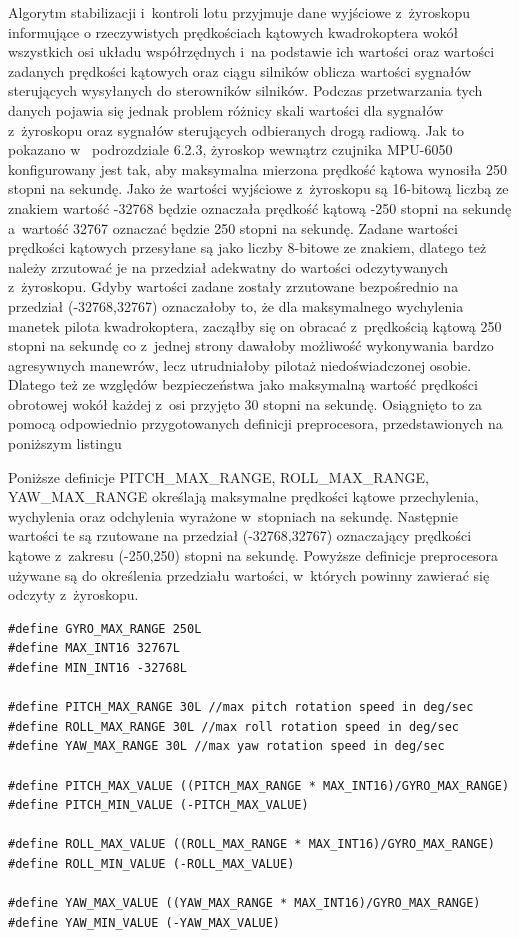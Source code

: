 \documentclass[11pt, twoside]{Thesis} %
\begin{document}
Algorytm stabilizacji i~kontroli lotu przyjmuje dane wyjściowe z~żyroskopu informujące o rzeczywistych prędkościach kątowych kwadrokoptera wokół wszystkich osi układu współrzędnych i~na podstawie ich wartości oraz wartości zadanych prędkości kątowych oraz ciągu silników oblicza wartości sygnałów sterujących wysyłanych do sterowników silników. Podczas przetwarzania tych danych pojawia się jednak problem różnicy skali wartości dla sygnałów z~żyroskopu oraz sygnałów sterujących odbieranych drogą radiową. Jak to pokazano w~ podrozdziale 6.2.3, żyroskop wewnątrz czujnika MPU-6050 konfigurowany jest tak, aby maksymalna mierzona prędkość kątowa wynosiła 250 stopni na sekundę. Jako że wartości wyjściowe z~żyroskopu są 16-bitową liczbą ze znakiem wartość -32768 będzie oznaczała prędkość kątową -250 stopni na sekundę a~wartość 32767 oznaczać będzie 250 stopni na sekundę. Zadane wartości prędkości kątowych przesyłane są jako liczby 8-bitowe ze znakiem, dlatego też należy zrzutować je na przedział adekwatny do wartości odczytywanych z~żyroskopu. Gdyby wartości zadane zostały zrzutowane bezpośrednio na przedział (-32768,32767) oznaczałoby to, że dla maksymalnego wychylenia manetek pilota kwadrokoptera, zacząłby się on obracać z~prędkością kątową 250 stopni na sekundę co z~jednej strony dawałoby możliwość wykonywania bardzo agresywnych manewrów, lecz utrudniałoby pilotaż niedoświadczonej osobie. Dlatego też ze względów bezpieczeństwa jako maksymalną wartość prędkości obrotowej wokół każdej z~osi przyjęto 30 stopni na sekundę. Osiągnięto to za pomocą odpowiednio przygotowanych definicji preprocesora, przedstawionych na poniższym listingu


Poniższe definicje PITCH\_MAX\_RANGE, ROLL\_MAX\_RANGE, YAW\_MAX\_RANGE określają maksymalne prędkości kątowe przechylenia, wychylenia oraz odchylenia wyrażone w~stopniach na sekundę. Następnie wartości te są rzutowane na przedział (-32768,32767) oznaczający prędkości kątowe z~zakresu (-250,250) stopni na sekundę. Powyższe definicje preprocesora używane są do określenia przedziału wartości, w~których powinny zawierać się odczyty z~żyroskopu.

\begin{lstlisting}
#define GYRO_MAX_RANGE 250L
#define MAX_INT16 32767L
#define MIN_INT16 -32768L

#define PITCH_MAX_RANGE 30L //max pitch rotation speed in deg/sec
#define ROLL_MAX_RANGE 30L //max roll rotation speed in deg/sec
#define YAW_MAX_RANGE 30L //max yaw rotation speed in deg/sec

#define PITCH_MAX_VALUE ((PITCH_MAX_RANGE * MAX_INT16)/GYRO_MAX_RANGE)
#define PITCH_MIN_VALUE (-PITCH_MAX_VALUE)

#define ROLL_MAX_VALUE ((ROLL_MAX_RANGE * MAX_INT16)/GYRO_MAX_RANGE)
#define ROLL_MIN_VALUE (-ROLL_MAX_VALUE)

#define YAW_MAX_VALUE ((YAW_MAX_RANGE * MAX_INT16)/GYRO_MAX_RANGE)
#define YAW_MIN_VALUE (-YAW_MAX_VALUE)
\end{lstlisting}
\end{document}
